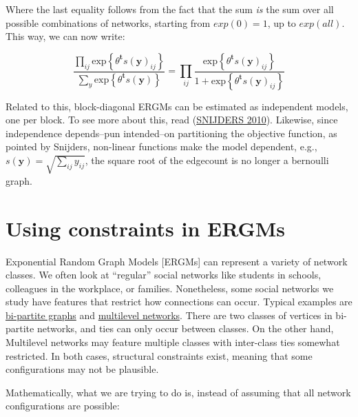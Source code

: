 \documentclass[
]{book}
\begin{document}
Where the last equality follows from the fact that the sum \emph{is} the sum over all possible combinations of networks, starting from \(exp(0) = 1\), up to \(exp(all)\). This way, we can now write:

\begin{equation}
\frac{\prod_{ij}\mbox{exp}\left\{{\theta}^\mathbf{t}s\left(\mathbf{y}\right)_{ij}\right\}}{\sum_{y}\mbox{exp}\left\{{\theta}^\mathbf{t}s\left(\mathbf{y}\right)\right\}} = 
\prod_{ij}\frac{\mbox{exp}\left\{{\theta}^\mathbf{t}s\left(\mathbf{y}\right)_{ij}\right\}}{1 + \mbox{exp}\left\{{\theta}^\mathbf{t}s\left(\mathbf{y}\right)_{ij}\right\}}
\end{equation}

Related to this, block-diagonal ERGMs can be estimated as independent models, one per block. To see more about this, read (\protect\hyperlink{ref-Snijders2010margin}{SNIJDERS 2010}). Likewise, since independence depends--pun intended--on partitioning the objective function, as pointed by Snijders, non-linear functions make the model dependent, e.g., \(s\left(\mathbf{y}\right) = \sqrt{\sum_{ij}y_{ij}}\), the square root of the edgecount is no longer a bernoulli graph.

\renewcommand{\Pr}[1]{\mathbb{P}{#1}}

\hypertarget{using-constraints-in-ergms}{%
\chapter{Using constraints in ERGMs}\label{using-constraints-in-ergms}}

Exponential Random Graph Models {[}ERGMs{]} can represent a variety of network classes. We often look at ``regular'' social networks like students in schools, colleagues in the workplace, or families. Nonetheless, some social networks we study have features that restrict how connections can occur. Typical examples are \href{https://en.wikipedia.org/wiki/Bipartite_graph}{bi-partite graphs} and \href{https://cran.r-project.org/web/packages/mlergm/vignettes/mlergm_tutorial.html}{multilevel networks}. There are two classes of vertices in bi-partite networks, and ties can only occur between classes. On the other hand, Multilevel networks may feature multiple classes with inter-class ties somewhat restricted. In both cases, structural constraints exist, meaning that some configurations may not be plausible.

Mathematically, what we are trying to do is, instead of assuming that all network configurations are possible:
\end{document}
